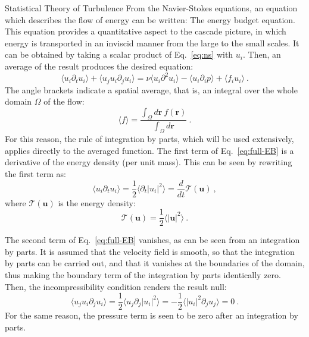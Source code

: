 \begin{chapter}{Statistical Theory of Turbulence}
From the Navier-Stokes equations, an equation which describes
the flow of energy can be written: The energy budget equation.
This equation provides a quantitative aspect to the cascade picture, in which energy is transported in an inviscid manner from the large to the small scales. It can be obtained by taking a scalar
product of Eq.~\eqref{eq:ns} with $u_i$. Then, an average of the result produces
the desired equation:
\begin{equation} \label{eq:full-EB}
	\big\langle u_i \partial_t u_i \big\rangle+
	\big\langle u_j u_i \partial_j u_i \big\rangle =
	\nu \big\langle u_i \partial^2 u_i \big\rangle
	- \big\langle u_i \partial_i  p \big\rangle +
	\big\langle f_i u_i \big\rangle \ .
\end{equation}
The angle brackets indicate a spatial average, that is, an integral over the whole domain $\Omega$
of the flow:
\begin{equation}
	\langle f \rangle = \frac{\int_{\Omega} d\mathbf{r} \ f(\mathbf{r})}
	{\int_{\Omega} d\mathbf{r} } \ .
\end{equation}
For this reason, the rule of integration by parts, which will
be used extensively, applies directly to the averaged function.
The first term of Eq.~\eqref{eq:full-EB} is a derivative of the energy density (per unit mass).
This can be seen by rewriting the first term as:
\begin{equation} \label{eq:EB-energy}
	\big\langle u_i \partial_t u_i \big\rangle
	= \frac12 \big\langle \partial_t |u_i|^2 \big\rangle
	= \frac{d}{dt} \mathcal{T}(\mathbf{u}) \ ,
\end{equation}
where $\mathcal{T}(\mathbf{u})$ is the energy density:
\begin{equation}
	\mathcal{T}(\mathbf{u}) = \frac12 \big\langle |\mathbf{u}|^2 \big\rangle \ .
\end{equation}

The second term of Eq.~\eqref{eq:full-EB} vanishes, as can be seen
from an integration by parts. It is assumed that the velocity field is smooth,
so that the integration by parts can be carried out, and that it vanishes at the boundaries
of the domain, thus making the boundary term of the integration by parts identically zero.
Then, the incompressibility condition renders the result null:
\begin{equation}
	\big\langle u_j u_i \partial_j u_i \big\rangle =
	\frac12 \big\langle u_j \partial_j |u_i|^2 \big\rangle =
	- \frac12 \big\langle |u_i|^2 \partial_j u_j \big\rangle = 0 \ .
\end{equation}
For the same reason, the pressure term is seen to be zero
after an integration by parts.


\end{chapter}

